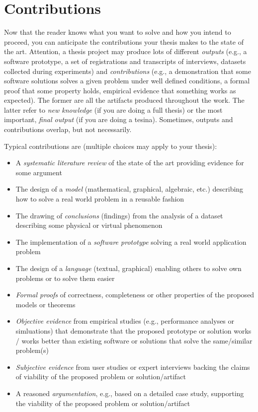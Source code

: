 \section{Contributions}
\label{sec:contributions}
Now that the reader knows what you want to solve and how you intend to proceed, you can anticipate the contributions your thesis makes to the state of the art. Attention, a thesis project may produce lots of different \emph{outputs} (e.g., a software prototype, a set of registrations and transcripts of interviews, datasets collected during experiments) and \emph{contributions} (e.g., a demonstration that some software solutions solves a given problem under well defined conditions, a formal proof that some property holds, empirical evidence that something works as expected). The former are all the artifacts produced throughout the work. The latter refer to  \emph{new knowledge} (if you are doing a full thesis) or the most important, \emph{final output} (if you are doing a tesina). Sometimes, outputs and contributions overlap, but not necessarily. 

Typical contributions are (multiple choices may apply to your thesis):

\begin{itemize}
\item[\Square] A \emph{systematic literature review} of the state of the art providing evidence for some argument
\item[\Square] The design of a \emph{model} (mathematical, graphical, algebraic, etc.) describing how to solve a real world problem in a reusable fashion
\item[\Square] The drawing of \emph{conclusions} (findings) from the analysis of a dataset describing some physical or virtual phenomenon
\item[\Square] The implementation of a \emph{software prototype} solving a real world application problem
\item[\Square] The design of a \emph{language} (textual, graphical) enabling others to solve own problems or to solve them easier
\item[\Square] \emph{Formal proofs} of correctness, completeness or other properties of the proposed models or theorems 
\item[\Square] \emph{Objective evidence} from empirical studies (e.g., performance analyses or simluations) that demonstrate that the proposed prototype or solution works / works better than existing software or solutions that solve the same/similar problem(s)
\item[\Square] \emph{Subjective evidence} from user studies or expert interviews backing the claims of viability of the proposed problem or solution/artifact
\item[\Square] A reasoned \emph{argumentation}, e.g., based on a detailed case study, supporting the viability of the proposed problem or solution/artifact
\end{itemize}


